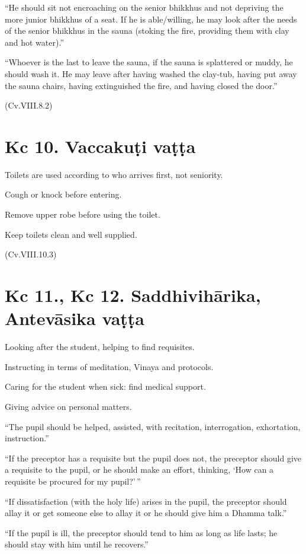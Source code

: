 ``He should sit not encroaching on the senior bhikkhus and not depriving
the more junior bhikkhus of a seat. If he is able/willing, he may look
after the needs of the senior bhikkhus in the sauna (stoking the fire,
providing them with clay and hot water).''

``Whoever is the last to leave the sauna, if the sauna is splattered or
muddy, he should wash it. He may leave after having washed the clay-tub,
having put away the sauna chairs, having extinguished the fire, and
having closed the door.''

(Cv.VIII.8.2)

\section{Kc 10. Vaccakuṭi vaṭṭa}

Toilets are used according to who arrives first, not seniority.

Cough or knock before entering.

Remove upper robe before using the toilet.

Keep toilets clean and well supplied.

(Cv.VIII.10.3)

\section{Kc 11., Kc 12. Saddhivihārika, Antevāsika vaṭṭa}

Looking after the student, helping to find requisites.

Instructing in terms of meditation, Vinaya and protocols.

Caring for the student when sick: find medical support.

Giving advice on personal matters.

``The pupil should be helped, assisted, with recitation, interrogation,
exhortation, instruction.''

``If the preceptor has a requisite but the pupil does not, the preceptor
should give a requisite to the pupil, or he should make an effort,
thinking, `How can a requisite be procured for my pupil?'\,''

``If dissatisfaction (with the holy life) arises in the pupil, the
preceptor should allay it or get someone else to allay it or he should
give him a Dhamma talk.''

``If the pupil is ill, the preceptor should tend to him as long as life
lasts; he should stay with him until he recovers.''

